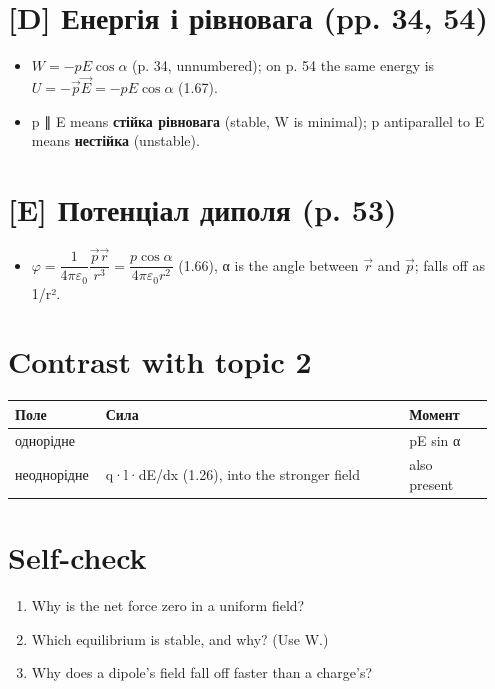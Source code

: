 \documentclass[11pt,a4paper,oneside]{book}
\begin{document}
\section*{[D] Енергія і рівновага (pp. 34, 54)}
\begin{itemize}
\item $W = -pE\cos\alpha$ (p. 34, unnumbered); on p. 54 the same energy is $U = -\vec p\vec E = -pE\cos\alpha$ (1.67).
\item p ∥ E means \textbf{стійка рівновага} (stable, W is minimal); p antiparallel to E means \textbf{нестійка} (unstable).
\end{itemize}

\section*{[E] Потенціал диполя (p. 53)}
\begin{itemize}
\item $\varphi = \dfrac{1}{4\pi\varepsilon_0}\dfrac{\vec p\vec r}{r^3} = \dfrac{p\cos\alpha}{4\pi\varepsilon_0 r^2}$ (1.66), α is the angle between $\vec r$ and $\vec p$; falls off as 1/r².
\end{itemize}

\section*{Contrast with topic 2}
{\small
\begin{longtable}{>{\raggedright\arraybackslash}p{0.164\linewidth}>{\raggedright\arraybackslash}p{0.610\linewidth}>{\raggedright\arraybackslash}p{0.178\linewidth}}
\toprule
\textbf{Поле} & \textbf{Сила} & \textbf{Момент} \\
\midrule
\endhead
однорідне & 0 & pE sin α \\
неоднорідне & q·l·dE/dx (1.26), into the stronger field & also present \\
\bottomrule
\end{longtable}
}

\section*{Self-check}
\begin{enumerate}
\item Why is the net force zero in a uniform field?
\item Which equilibrium is stable, and why? (Use W.)
\item Why does a dipole's field fall off faster than a charge's?
\end{enumerate}
\end{document}

